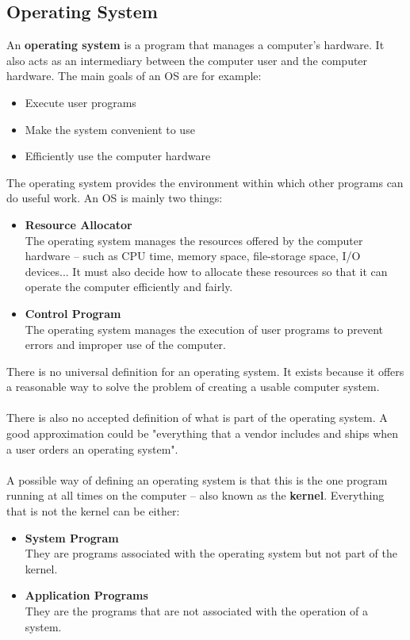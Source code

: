 \documentclass{article}
\begin{document}
\subsection{Operating System}
An \textbf{operating system} is a program that manages a computer's hardware. It also acts as an intermediary between the computer user and the computer hardware. The main goals of an OS are for example:

\begin{itemize}
	\item Execute user programs
	\item Make the system convenient to use
	\item Efficiently use the computer hardware
\end{itemize}
The operating system provides the environment within which other programs can do useful work. An OS is mainly two things:

\begin{itemize}
	\item \textbf{Resource Allocator}
	\vspace{.2cm} \\
	The operating system manages the resources offered by the computer hardware -- such as CPU time, memory space, file-storage space, I/O devices... It must also decide how to allocate these resources so that it can operate the computer efficiently and fairly.
	
	\item \textbf{Control Program}
	\vspace{.2cm} \\
	The operating system manages the execution of user programs to prevent errors and improper use of the computer.
\end{itemize}
There is no universal definition for an operating system. It exists because it offers a reasonable way to solve the problem of creating a usable computer system. \\ \\
There is also no accepted definition of what is part of the operating system. A good approximation could be "everything that a vendor includes and ships when a user orders an operating system". \\ \\
A possible way of defining an operating system is that this is the one program running at all times on the computer -- also known as the \textbf{kernel}. Everything that is not the kernel can be either:

\begin{itemize}
	\item \textbf{System Program}
	\vspace{.2cm} \\
	They are programs associated with the operating system but not part of the kernel.
	
	\item \textbf{Application Programs}
	\vspace{.2cm} \\
	They are the programs that are not associated with the operation of a system.
\end{itemize}
\end{document}
